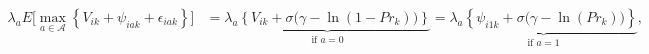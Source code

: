 \begin{equation}
\begin{split}
	\lambda_{a} E\Big[ \underset{a \in \mathcal{A}}{\max} \left\{ V_{ik} + \psi_{iak} + \epsilon_{iak} \right\} \Big] 
	& =  
	\underbrace{\lambda_{a} \left\{ V_{ik} + \sigma \big( \gamma - \ln(1 - Pr_{k}) \big) \right\} }_{\text{if \ $a = 0$}} = \underbrace{\lambda_{a} \left\{ \psi_{i1k} + \sigma \big( \gamma - \ln(Pr_{k}) \big) \right\} }_{\text{if \ $a = 1$}},
\end{split}
\label{Equation:Firms-Problem_Emax}
\end{equation}